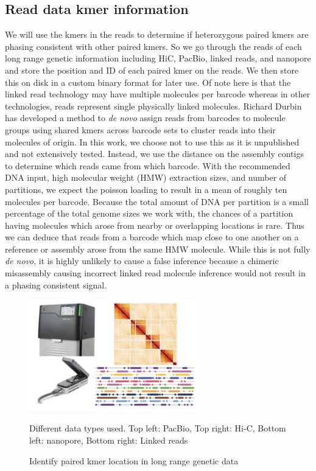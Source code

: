 \subsection{Read data kmer information}
\par{
We will use the kmers in the reads to determine if heterozygous paired kmers are phasing consistent with other paired kmers. So we go through the reads of each long range genetic information including HiC, PacBio, linked reads, and nanopore and store the position and ID of each paired kmer on the reads. We then store this on disk in a custom binary format for later use. Of note here is that the linked read technology may have multiple molecules per barcode whereas in other technologies, reads represent single physically linked molecules. Richard Durbin has developed a method to \textit{de novo} assign reads from barcodes to molecule groups using shared kmers across barcode sets to cluster reads into their molecules of origin. In this work, we choose not to use this as it is unpublished and not extensively tested. Instead, we use the distance on the assembly contigs to determine which reads came from which barcode. With the recommended DNA input, high molecular weight (HMW) extraction sizes, and number of partitions, we expect the poisson loading to result in a mean of roughly ten molecules per barcode. Because the total amount of DNA per partition is a small percentage of the total genome sizes we work with, the chances of a partition having molecules which arose from nearby or overlapping locations is rare. Thus we can deduce that reads from a barcode which map close to one another on a reference or assembly arose from the same HMW molecule. While this is not fully \textit{de novo}, it is highly unlikely to cause a false inference because a chimeric misassembly causing incorrect linked read molecule inference would not result in a phasing consistent signal.
}

\begin{figure}[htbp!]

\caption{Identify paired kmer location in long range genetic data}
\label{figure:techs}
\begin{centering}
\includegraphics[width=0.65\textwidth]{techs.png}
\par{Different data types used. Top left: PacBio, Top right: Hi-C, Bottom left: nanopore, Bottom right: Linked reads}
\end{centering}
\end{figure}

